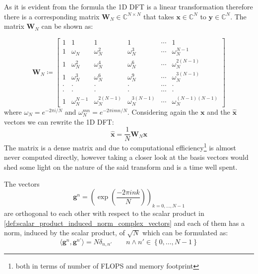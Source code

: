 \begin{Rem}
As it is evident from the formula the 1D \ac{DFT} is a linear transformation therefore there is a corresponding matrix 
$\boldsymbol{W}_N \in \mathbb{C}^{N\times N}$ that takes $\boldsymbol{x} \in \mathbb{C}^N$ to $\boldsymbol{y} \in \mathbb{C}^N$. 
The matrix $\boldsymbol{W}_N$ can be shown as:

\begin{equation}
    \boldsymbol{W}_N \coloneqq 
    \begin{bmatrix}
        1     & 1                & 1                   & 1                   & \cdots & 1                      \\
        1     & \omega_{N}^{}    & \omega_{N}^{2}      & \omega_{N}^{3}      & \cdots & \omega_{N}^{N-1}       \\
        1     & \omega_{N}^{2}   & \omega_{N}^{4}      & \omega_{N}^{6}      & \cdots & \omega_{N}^{2(N-1)}    \\
        1     & \omega_{N}^{3}   & \omega_{N}^{6}      & \omega_{N}^{9}      & \cdots & \omega_{N}^{3(N-1)}    \\
        \cdot & \cdot            & \cdot               & \cdot               & \cdots & \cdot                  \\ 
        \cdot & \cdot            & \cdot               & \cdot               & \cdots & \cdot                  \\ 
        1     & \omega_{N}^{N-1} & \omega_{N}^{2(N-1)} & \omega_{N}^{3(N-1)} & \cdots & \omega_{N}^{(N-1)(N-1)}
        \end{bmatrix}
\end{equation}
where $\omega_N = e^{-2\pi i/N}$ and $\omega_N^{mn} = e^{-2\pi imn/N}$. Considering again the $\boldsymbol{x}$
and the $\hat {\boldsymbol{x}}$ vectors we can rewrite the 1D \ac{DFT}:
\begin{equation}
    \hat {\boldsymbol{x}} = \frac{1}{N}\boldsymbol{W}_N\boldsymbol{x}
\end{equation}
 The matrix is a dense matrix\cite{Frazier1999} and due to computational 
efficiency\footnote{both in terms of number of FLOPS and memory footprint}\cite{Frazier1999} is almost never computed directly, 
however taking a closer look at the basis vectors would shed some light on the nature of the said transform and is a 
time well spent.
\end{Rem}
\begin{Prop}\label{prop:1ddft_vectors_orthononality}
    The vectors 
    \begin{equation}\label{eq:1ddft_vectors}
        \boldsymbol{g}^n = \left(\exp\left({\frac{-2\pi ink}{N}}\right)\right)_{k=0,\ldots,N-1}
    \end{equation}
    are orthogonal to each other with respect to the scalar product in \cref{def:scalar_product_induced_norm_complex_vectors} and 
    each of them has a norm, induced by the scalar product, of $\sqrt{N}$ which can be formulated as: 
    \begin{equation}
        \langle\boldsymbol{g}^n,\boldsymbol{g}^{n'}\rangle= N \delta_{n,n'} \qquad n \land n'\in \left\{0,\ldots,N-1\right\}
    \end{equation}
\end{Prop}

